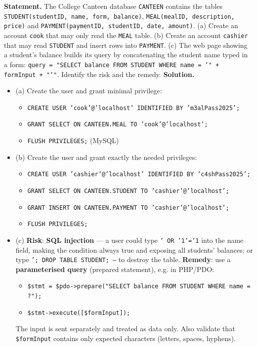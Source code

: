 \documentclass[11pt]{article}
\begin{document}
\begin{exoresolu}
\textbf{Statement.} The College Canteen database \texttt{CANTEEN} contains the tables \texttt{STUDENT(studentID, name, form, balance)}, \texttt{MEAL(mealID, description, price)} and \texttt{PAYMENT(paymentID, studentID, date, amount)}. 
(a) Create an account \texttt{cook} that may only read the \texttt{MEAL} table. 
(b) Create an account \texttt{cashier} that may read \texttt{STUDENT} and insert rows into \texttt{PAYMENT}. 
(c) The web page showing a student's balance builds its query by concatenating the student name typed in a form: \texttt{query = "SELECT balance FROM STUDENT WHERE name = '" + formInput + "'"}. Identify the risk and the remedy.
\tcblower
\textbf{Solution.}
\begin{itemize}
\item (a) Create the user and grant minimal privilege:
\begin{itemize}
\item \texttt{CREATE USER 'cook'@'localhost' IDENTIFIED BY 'm3alPass2025';}
\item \texttt{GRANT SELECT ON CANTEEN.MEAL TO 'cook'@'localhost';}
\item \texttt{FLUSH PRIVILEGES;} (MySQL)
\end{itemize}
\item (b) Create the user and grant exactly the needed privileges:
\begin{itemize}
\item \texttt{CREATE USER 'cashier'@'localhost' IDENTIFIED BY 'c4shPass2025';}
\item \texttt{GRANT SELECT ON CANTEEN.STUDENT TO 'cashier'@'localhost';}
\item \texttt{GRANT INSERT ON CANTEEN.PAYMENT TO 'cashier'@'localhost';}
\item \texttt{FLUSH PRIVILEGES;}
\end{itemize}
\item (c) \textbf{Risk}: \textbf{SQL injection} — a user could type \texttt{' OR '1'='1} into the name field, making the condition always true and exposing all students' balances; or type \texttt{'; DROP TABLE STUDENT; --} to destroy the table. 
\textbf{Remedy}: use a \textbf{parameterised query} (prepared statement), e.g. in PHP/PDO:
\begin{itemize}
\item \texttt{\$stmt = \$pdo->prepare("SELECT balance FROM STUDENT WHERE name = ?");}
\item \texttt{\$stmt->execute([\$formInput]);}
\end{itemize}
The input is sent separately and treated as data only. Also validate that \texttt{\$formInput} contains only expected characters (letters, spaces, hyphens).
\end{itemize}
\end{exoresolu}
\end{document}
